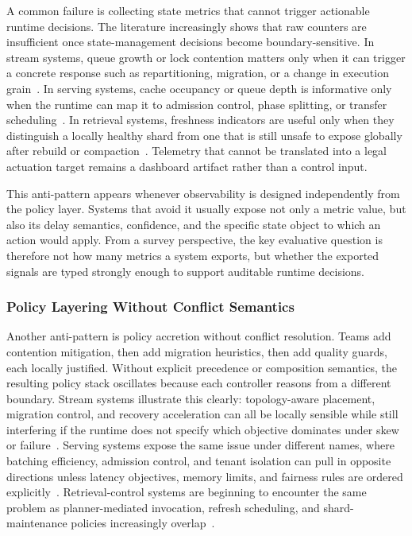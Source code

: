 \documentclass[acmsmall,screen,review]{acmart}
\begin{document}
A common failure is collecting state metrics that cannot trigger actionable runtime decisions. The literature increasingly shows that raw counters are insufficient once state-management decisions become boundary-sensitive. In stream systems, queue growth or lock contention matters only when it can trigger a concrete response such as repartitioning, migration, or a change in execution grain~\cite{zhang2017revisiting,zhang2019briskstream}. In serving systems, cache occupancy or queue depth is informative only when the runtime can map it to admission control, phase splitting, or transfer scheduling~\cite{agrawal2024sarathi,zhong2024distserve}. In retrieval systems, freshness indicators are useful only when they distinguish a locally healthy shard from one that is still unsafe to expose globally after rebuild or compaction~\cite{zhang2026flowrag,wang2026candor}. Telemetry that cannot be translated into a legal actuation target remains a dashboard artifact rather than a control input.

This anti-pattern appears whenever observability is designed independently from the policy layer. Systems that avoid it usually expose not only a metric value, but also its delay semantics, confidence, and the specific state object to which an action would apply. From a survey perspective, the key evaluative question is therefore not how many metrics a system exports, but whether the exported signals are typed strongly enough to support auditable runtime decisions.

\subsubsection{Policy Layering Without Conflict Semantics}

Another anti-pattern is policy accretion without conflict resolution. Teams add contention mitigation, then add migration heuristics, then add quality guards, each locally justified. Without explicit precedence or composition semantics, the resulting policy stack oscillates because each controller reasons from a different boundary. Stream systems illustrate this clearly: topology-aware placement, migration control, and recovery acceleration can all be locally sensible while still interfering if the runtime does not specify which objective dominates under skew or failure~\cite{zhang2019briskstream,nasir2019megaphone,zhao2024recovery}. Serving systems expose the same issue under different names, where batching efficiency, admission control, and tenant isolation can pull in opposite directions unless latency objectives, memory limits, and fairness rules are ordered explicitly~\cite{gujarati2020clockwork,chen2024punica,zhong2024distserve}. Retrieval-control systems are beginning to encounter the same problem as planner-mediated invocation, refresh scheduling, and shard-maintenance policies increasingly overlap~\cite{asai2024selfrag,zhang2026flowrag}.
\end{document}
